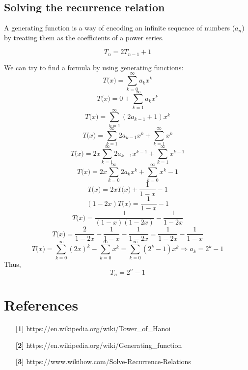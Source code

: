 \documentclass{article}
\begin{document}
    \subsection{Solving the recurrence relation}
        A generating function is a way of encoding an infinite sequence of numbers (\(a_n\)) by treating them as the coefficients of a power series.

        \begin{equation}
            T_n = 2T_{n-1} + 1
        \end{equation}
        
        We can try to find a formula by using generating functions:
        \begin{equation}
            T\textit{(x)} = \sum_{k=0}^\infty a_kx^k
        \end{equation}
        \[T\textit{(x)} = 0 + \sum_{k=1}^\infty a_kx^k\]
        \[T\textit{(x)} = \sum_{k=1}^\infty (2a_{k-1}+1)x^k\]
        \[T\textit{(x)} = \sum_{k=1}^\infty 2a_{k-1}x^k + \sum_{k=1}^\infty x^k\]
        \[T\textit{(x)} = 2x\sum_{k=1}^\infty 2a_{k-1}x^{k-1} + \sum_{k=1}^\infty x^{k-1}\]
        \[T\textit{(x)} = 2x\sum_{k=0}^\infty 2a_{k}x^{k} + \sum_{k=0}^\infty x^{k} - 1\]
        \[T\textit{(x)} = 2xT\textit{(x)} + \frac{1}{1-x} - 1\]
        \[(1-2x)T\textit{(x)} = \frac{1}{1-x} - 1\]
        \[T\textit{(x)} = \frac{1}{(1-x)(1-2x)} - \frac{1}{1-2x}\]
        \[T\textit{(x)} = \frac{2}{1-2x} -\frac{1}{1-x} - \frac{1}{1-2x} = \frac{1}{1-2x} - \frac{1}{1-x}\]
        \[T\textit{(x)} = \sum_{k=0}^\infty (2x)^k - \sum_{k=0}^\infty x^k = \sum_{k=0}^\infty (2^k-1)x^k \Longrightarrow a_k = 2^k-1\]
        Thus,
        \begin{equation}
            T_n = 2^n - 1
        \end{equation}
\section{References}
    \begin{itemize}
        \item [\textbf{[1]}] https://en.wikipedia.org/wiki/Tower\_of\_Hanoi
        \item [\textbf{[2]}] https://en.wikipedia.org/wiki/Generating\_function
        \item [\textbf{[3]}] https://www.wikihow.com/Solve-Recurrence-Relations
    \end{itemize}
\end{document}
